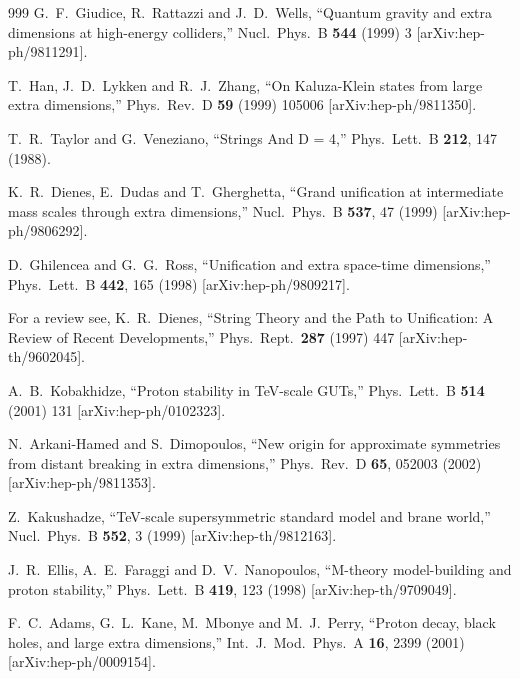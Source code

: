 \begin{thebibliography}{999}
  G.~F.~Giudice, R.~Rattazzi and J.~D.~Wells,
  ``Quantum gravity and extra dimensions at high-energy colliders,''
  Nucl.\ Phys.\ B {\bf 544} (1999) 3
  [arXiv:hep-ph/9811291].

  T.~Han, J.~D.~Lykken and R.~J.~Zhang,
  ``On Kaluza-Klein states from large extra dimensions,''
  Phys.\ Rev.\ D {\bf 59} (1999) 105006
  [arXiv:hep-ph/9811350].

  T.~R.~Taylor and G.~Veneziano,
  ``Strings And D = 4,''
  Phys.\ Lett.\ B {\bf 212}, 147 (1988).

  K.~R.~Dienes, E.~Dudas and T.~Gherghetta,
  ``Grand unification at intermediate mass scales through extra dimensions,''
  Nucl.\ Phys.\ B {\bf 537}, 47 (1999)
  [arXiv:hep-ph/9806292].

  D.~Ghilencea and G.~G.~Ross,
  ``Unification and extra space-time dimensions,''
  Phys.\ Lett.\ B {\bf 442}, 165 (1998)
  [arXiv:hep-ph/9809217].

For a review see, 
  K.~R.~Dienes,
 ``String Theory and the Path to Unification: A Review of Recent
  Developments,''
  Phys.\ Rept.\  {\bf 287} (1997) 447
  [arXiv:hep-th/9602045].

  A.~B.~Kobakhidze,
  ``Proton stability in TeV-scale GUTs,''
  Phys.\ Lett.\ B {\bf 514} (2001) 131
  [arXiv:hep-ph/0102323].

  N.~Arkani-Hamed and S.~Dimopoulos,
  ``New origin for approximate symmetries from distant breaking in extra
  dimensions,''
  Phys.\ Rev.\ D {\bf 65}, 052003 (2002)
  [arXiv:hep-ph/9811353].

  Z.~Kakushadze,
  ``TeV-scale supersymmetric standard model and brane world,''
  Nucl.\ Phys.\ B {\bf 552}, 3 (1999)
  [arXiv:hep-th/9812163].

  J.~R.~Ellis, A.~E.~Faraggi and D.~V.~Nanopoulos,
  ``M-theory model-building and proton stability,''
  Phys.\ Lett.\ B {\bf 419}, 123 (1998)
  [arXiv:hep-th/9709049].

  F.~C.~Adams, G.~L.~Kane, M.~Mbonye and M.~J.~Perry,
  ``Proton decay, black holes, and large extra dimensions,''
  Int.\ J.\ Mod.\ Phys.\ A {\bf 16}, 2399 (2001)
  [arXiv:hep-ph/0009154].


\end{thebibliography}
